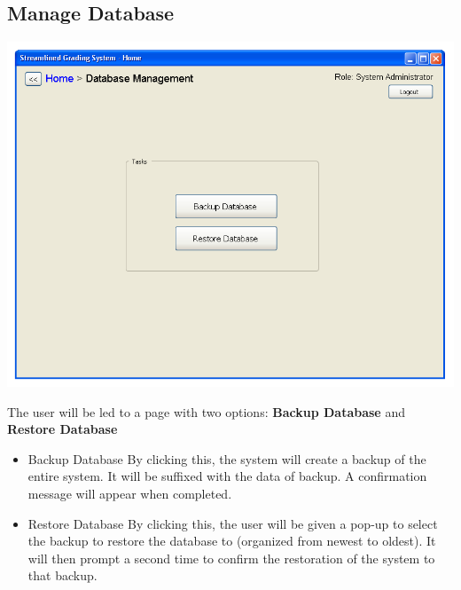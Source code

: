 \documentclass{article}
\begin{document}
\subsection{Manage Database}
\centerline{\includegraphics[scale=0.55]{../images/UIMockups/pngs/databaseManagement}}
\label{manageDB}
The user will be led to a page with two options: \textbf{Backup Database} and
\textbf{Restore Database}
\begin{itemize}
  \item Backup Database
    By clicking this, the system will create a backup of the entire system.
    It will be suffixed with the data of backup. A confirmation message will
    appear when completed.
  \item Restore Database
    By clicking this, the user will be given a pop-up to select the backup to
    restore the database to (organized from newest to oldest). It will then
    prompt a second time to confirm the restoration of the system to that backup.
\end{itemize}
\end{document}
